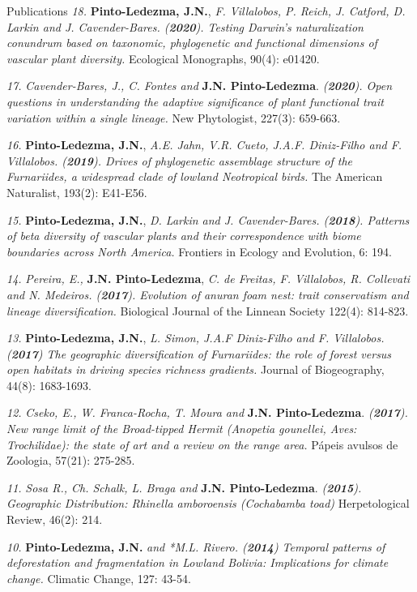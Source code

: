 \documentclass{resume} %
\begin{document}
\begin{rSection}{Publications}
{\em 18.} {\bf{Pinto-Ledezma, J.N.}}, {\em F. Villalobos, P. Reich, J. Catford, D. Larkin and J. Cavender-Bares. ({{\bf 2020}}). Testing Darwin's naturalization conundrum based on taxonomic, phylogenetic and functional dimensions of vascular plant diversity.} {Ecological Monographs, 90(4): e01420}. 

{\em 17.} {\em Cavender-Bares, J., C. Fontes and} {\bf{J.N. Pinto-Ledezma}}. {\em ({{\bf 2020}}). Open questions in understanding the adaptive significance of plant functional trait variation within a single lineage.} {New Phytologist, 227(3): 659-663}. 

{\em 16.} {\bf{Pinto-Ledezma, J.N.}}, {\em A.E. Jahn, V.R. Cueto, J.A.F. Diniz-Filho and F. Villalobos. ({{\bf 2019}}). Drives of phylogenetic assemblage structure of the Furnariides, a widespread clade of lowland Neotropical birds.} {The American Naturalist, 193(2): E41-E56}. 

{\em 15.} {\bf{Pinto-Ledezma, J.N.}}, {\em D. Larkin and J. Cavender-Bares. ({{\bf 2018}}). Patterns of beta diversity of vascular plants and their correspondence with biome boundaries across North America.} {Frontiers in Ecology and Evolution, 6: 194}.

{\em 14.} {\em Pereira, E.,} {\bf{J.N. Pinto-Ledezma}}, {\em C. de Freitas, F. Villalobos, R. Collevati and N. Medeiros. ({{\bf 2017}}). Evolution of anuran foam nest: trait conservatism and lineage diversification.} {Biological Journal of the Linnean Society 122(4): 814-823}. 

{\em 13.} {\bf{Pinto-Ledezma, J.N.}}, {\em L. Simon, J.A.F Diniz-Filho and F. Villalobos. ({{\bf 2017}}) The geographic diversification of Furnariides: the role of forest versus open habitats in driving species richness gradients.} {Journal of Biogeography, 44(8): 1683-1693}. 

{\em 12.} {\em Cseko, E., W. Franca-Rocha, T. Moura and} {\bf{J.N. Pinto-Ledezma}}. {\em ({{\bf 2017}}). New range limit of the Broad-tipped Hermit ({\em Anopetia gounellei}, Aves: Trochilidae): the state of art and a review on the range area.} {Pápeis avulsos de Zoologia, 57(21): 275-285}. 

{\em 11.} {\em *Sosa R., Ch. Schalk, L. Braga and} {\bf{J.N. Pinto-Ledezma}}. {\em ({{\bf 2015}}). Geographic Distribution: {\em Rhinella amboroensis} (Cochabamba toad)} {Herpetological Review, 46(2): 214}.

{\em 10.} {\bf{Pinto-Ledezma, J.N.}} {\em and *M.L. Rivero. ({{\bf 2014}}) Temporal patterns of deforestation and fragmentation in Lowland Bolivia: Implications for climate change.} {Climatic Change, 127: 43-54}. 


\end{rSection}
\end{document}

